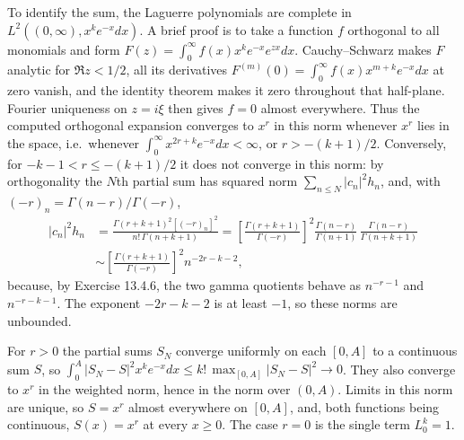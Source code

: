 To identify the sum, the Laguerre polynomials are complete in
$L^2((0,\infty),x^ke^{-x}dx)$.  A brief proof is to take a function
$f$ orthogonal to all monomials and form
$F(z)=\int_0^\infty f(x)x^ke^{-x}e^{zx}dx$.
Cauchy--Schwarz makes $F$ analytic for $\Re z<1/2$, all its derivatives
$F^{(m)}(0)=\int_0^\infty f(x)x^{m+k}e^{-x}dx$ at zero vanish, and the
identity theorem makes it zero throughout
that half-plane.  Fourier uniqueness on $z=i\xi$ then gives $f=0$
almost everywhere.  Thus the computed orthogonal expansion converges
to $x^r$ in this norm whenever $x^r$ lies in the space, i.e.\
whenever $\int_0^\infty x^{2r+k}e^{-x}dx<\infty$, or $r>-(k+1)/2$.
Conversely, for $-k-1<r\le-(k+1)/2$ it does not converge in this norm:
by orthogonality the $N$th partial sum has squared norm
$\sum_{n\le N}|c_n|^2h_n$, and, with $(-r)_n=\Gamma(n-r)/\Gamma(-r)$,
\begin{align*}
|c_n|^2h_n
 &=\frac{\Gamma(r+k+1)^2[(-r)_n]^2}{n!\,\Gamma(n+k+1)}
 =\left[\frac{\Gamma(r+k+1)}{\Gamma(-r)}\right]^2
 \frac{\Gamma(n-r)}{\Gamma(n+1)}\,\frac{\Gamma(n-r)}{\Gamma(n+k+1)}\\
 &\sim\left[\frac{\Gamma(r+k+1)}{\Gamma(-r)}\right]^2n^{-2r-k-2},
\end{align*}
because, by Exercise 13.4.6, the two gamma quotients behave as
$n^{-r-1}$ and $n^{-r-k-1}$.  The exponent $-2r-k-2$ is at least $-1$,
so these norms are unbounded.

For $r>0$ the partial sums $S_N$ converge uniformly on each $[0,A]$
to a continuous sum $S$, so
$\int_0^A|S_N-S|^2x^ke^{-x}dx\le k!\,\max_{[0,A]}|S_N-S|^2\to0$.
They also converge to $x^r$ in the weighted norm, hence in the norm
over $(0,A)$.  Limits in this norm are unique, so $S=x^r$ almost
everywhere on $[0,A]$, and, both functions being continuous,
$S(x)=x^r$ at every $x\ge0$.  The case $r=0$ is the single term
$L_0^k=1$.

